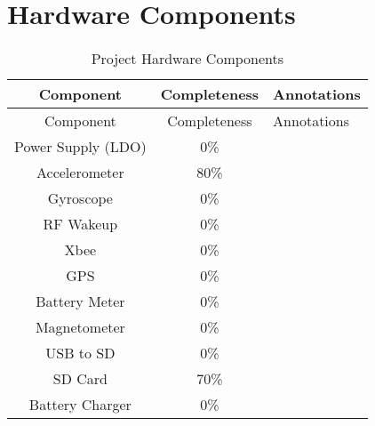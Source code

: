 \section{Hardware Components}

    \begin{center}
     \setlength{\extrarowheight}{0.6cm}
    \begin{longtable}{|c|c|m{3.1in}|}
        \caption{Project Hardware Components \label{tab:hwComp}} \\
        \hline
        \rowcolor{Gray}
        Component & Completeness & {\centering Annotations} \\ \hline \hline \endfirsthead
        \hline
        \rowcolor{Gray}
        Component & Completeness & {\centering Annotations} \\ \hline \hline \endhead
        \endfoot
       
        Power Supply (LDO) & 0\%   &  \\ \hline
        Accelerometer & 80\%  &  \\ \hline
        Gyroscope & 0\%   &  \\ \hline
        RF Wakeup & 0\%   &  \\ \hline
        Xbee  & 0\%   &  \\ \hline
        GPS   & 0\%   &  \\ \hline
        Battery Meter & 0\%   &  \\ \hline
        Magnetometer & 0\%   &  \\ \hline
        USB to SD & 0\%   &  \\ \hline
        SD Card & 70\%  &  \\ \hline
        Battery Charger & 0\%   &  \\ \hline
    \end{longtable}
    \end{center}

